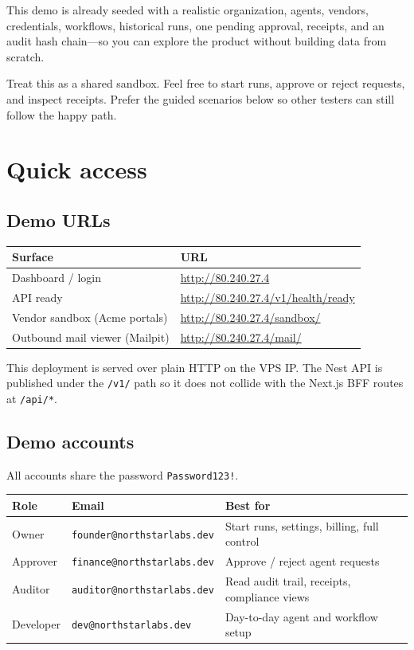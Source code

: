 \documentclass[11pt,a4paper]{article}
\newcommand{\DemoAppUrl}{http://80.240.27.4}
\newcommand{\DemoApiUrl}{http://80.240.27.4/v1}
\newcommand{\DemoSandboxUrl}{http://80.240.27.4/sandbox}
\newcommand{\DemoMailUrl}{http://80.240.27.4/mail}
\newcommand{\DemoPassword}{Password123!}
\newcommand{\email}[1]{\texttt{#1}}
\begin{document}
This demo is already seeded with a realistic organization, agents, vendors,
credentials, workflows, historical runs, one pending approval, receipts, and
an audit hash chain---so you can explore the product without building data from
scratch.

\begin{callout}
  Treat this as a shared sandbox. Feel free to start runs, approve or reject
  requests, and inspect receipts. Prefer the guided scenarios below so other
  testers can still follow the happy path.
\end{callout}

\section{Quick access}

\subsection{Demo URLs}

\begin{tabularx}{\textwidth}{@{}l X@{}}
  \toprule
  \textbf{Surface} & \textbf{URL} \\
  \midrule
  Dashboard / login & \url{\DemoAppUrl} \\
  API ready & \url{\DemoApiUrl/health/ready} \\
  Vendor sandbox (Acme portals) & \url{\DemoSandboxUrl/} \\
  Outbound mail viewer (Mailpit) & \url{\DemoMailUrl/} \\
  \bottomrule
\end{tabularx}

\begin{callout}
  This deployment is served over plain HTTP on the VPS IP. The Nest API is
  published under the \texttt{/v1/} path so it does not collide with the Next.js
  BFF routes at \texttt{/api/*}.
\end{callout}

\subsection{Demo accounts}

All accounts share the password \texttt{\DemoPassword}.

\begin{tabularx}{\textwidth}{@{}l l X@{}}
  \toprule
  \textbf{Role} & \textbf{Email} & \textbf{Best for} \\
  \midrule
  Owner & \email{founder@northstarlabs.dev} & Start runs, settings, billing, full control \\
  Approver & \email{finance@northstarlabs.dev} & Approve / reject agent requests \\
  Auditor & \email{auditor@northstarlabs.dev} & Read audit trail, receipts, compliance views \\
  Developer & \email{dev@northstarlabs.dev} & Day-to-day agent and workflow setup \\
  \bottomrule
\end{tabularx}
\end{document}
